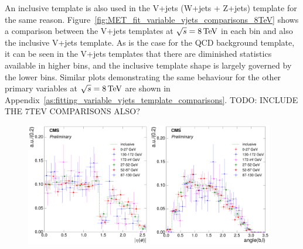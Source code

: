 An inclusive template is also used in the V+jets (W+jets + Z+jets) template for the same reason.
Figure~\ref{fig:MET_fit_variable_vjets_comparisons_8TeV} shows a comparison between the V+jets templates at
$\sqrt{s}=8\,\text{Te\hspace{-.08em}V}$ in each \met bin and also the inclusive \met V+jets template.
As is the case for the QCD background template, it can be seen in the V+jets templates that there are
diminished statistics available in higher bins, and the inclusive template shape is largely governed by the
lower bins. Similar plots demonstrating the same behaviour for the other primary variables at $\sqrt{s}=8\,\text{Te\hspace{-.08em}V}$
are shown in Appendix~\ref{as:fitting_variable_vjets_template_comparisons}. TODO: INCLUDE THE 7TEV COMPARISONS
ALSO? %

\begin{figure}[hbtp]
    \centering
     \includegraphics[width=0.48\textwidth]{Chapters/04_Analysis/04b_XSections/images/8TeV/fit_variables/electron/MET/electron_absolute_eta/vjets/MET_electron_absolute_eta_2orMoreBtags_VJets_template_comparison.pdf}\hfill
     \includegraphics[width=0.48\textwidth]{Chapters/04_Analysis/04b_XSections/images/8TeV/fit_variables/electron/MET/angle_bl/vjets/MET_angle_bl_2orMoreBtags_VJets_template_comparison.pdf}\\

\end{figure}
